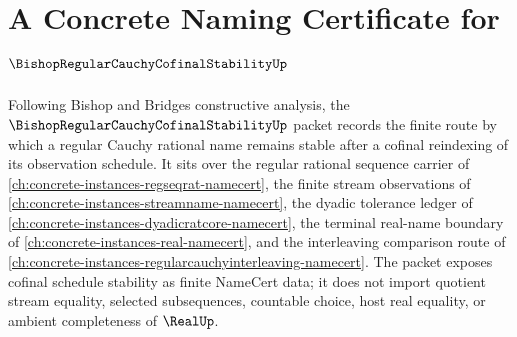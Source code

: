 \chapter{A Concrete Naming Certificate for $\BishopRegularCauchyCofinalStabilityUp$}
\label{ch:concrete-instances-bishop-regular-cauchy-cofinal-stability-namecert}

Following Bishop and Bridges constructive analysis, the $\BishopRegularCauchyCofinalStabilityUp$ packet records the finite route by which a regular Cauchy rational name remains stable after a cofinal reindexing of its observation schedule. It sits over the regular rational sequence carrier of \autoref{ch:concrete-instances-regseqrat-namecert}, the finite stream observations of \autoref{ch:concrete-instances-streamname-namecert}, the dyadic tolerance ledger of \autoref{ch:concrete-instances-dyadicratcore-namecert}, the terminal real-name boundary of \autoref{ch:concrete-instances-real-namecert}, and the interleaving comparison route of \autoref{ch:concrete-instances-regularcauchyinterleaving-namecert}. The packet exposes cofinal schedule stability as finite NameCert data; it does not import quotient stream equality, selected subsequences, countable choice, host real equality, or ambient completeness of $\RealUp$.

